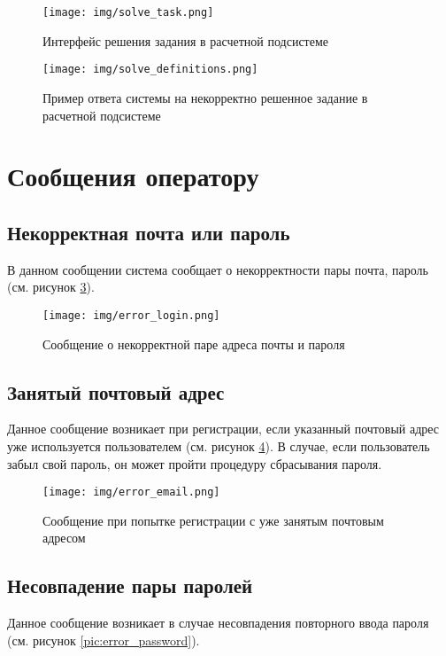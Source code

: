 \documentclass[a4paper,12pt,reqno]{article}
\begin{document}
    \begin{figure}[H]
        \centering
        \texttt{[image: img/solve\_task.png]}
        \caption{Интерфейс решения задания в расчетной подсистеме}
        \label{pic:solve_task}
    \end{figure}

    \begin{figure}[H]
        \centering
        \texttt{[image: img/solve\_definitions.png]}
        \caption{Пример ответа системы на некорректно решенное задание в расчетной подсистеме}
        \label{pic:solve_definitions}
    \end{figure}

    \newpage


    \section{Сообщения оператору}

    \subsection{Некорректная почта или пароль}
    В данном сообщении система сообщает о некорректности пары почта, пароль (см. рисунок \ref{pic:error_login}).

    \begin{figure}[H]
        \centering
        \texttt{[image: img/error\_login.png]}
        \caption{Сообщение о некорректной паре адреса почты и пароля}
        \label{pic:error_login}
    \end{figure}

    \subsection{Занятый почтовый адрес}
    Данное сообщение возникает при регистрации, если указанный почтовый адрес уже используется пользователем (см. рисунок \ref{pic:error_email}). В случае, если пользователь забыл свой пароль, он может пройти процедуру сбрасывания пароля.

    \begin{figure}[H]
        \centering
        \texttt{[image: img/error\_email.png]}
        \caption{Сообщение при попытке регистрации с уже занятым почтовым адресом}
        \label{pic:error_email}
    \end{figure}

    \subsection{Несовпадение пары паролей}
    Данное сообщение возникает в случае несовпадения повторного ввода пароля (см. рисунок \ref{pic:error_password}).
\end{document}
